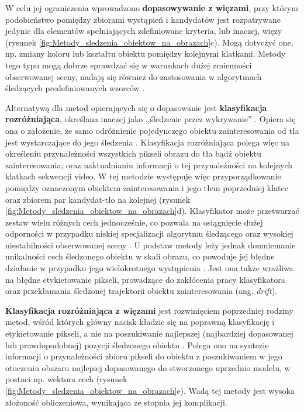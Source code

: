 W celu jej ograniczenia wprowadzono \textbf{dopasowywanie z więzami}, przy którym podobieństwo pomiędzy zbiorami wystąpień i kandydatów jest rozpatrywane jedynie dla elementów spełniających zdefiniowane kryteria, lub inaczej, więzy (rysunek \ref{fig:Metody_sledzenia_obiektow_na_obrazach}c). Mogą dotyczyć one, np. zmiany koloru lub kształtu obiektu pomiędzy kolejnymi klatkami. Metody tego typu mogą dobrze sprawdzać się w warunkach dużej zmienności obserwowanej sceny, nadają się również do zastosowania w algorytmach śledzących predefiniowanych wzorców \cite{Smeulders2010}.

Alternatywą dla metod opierających się o dopasowanie jest \textbf{klasyfikacja rozróżniająca}, określana inaczej jako ,,śledzenie przez wykrywanie'' \cite{Smeulders2010}. Opiera się ona o założenie, że samo odróżnienie pojedynczego obiektu zainteresowania od tła jest wystarczające do jego śledzenia \cite{Smeulders2010}. Klasyfikacja rozróżniająca polega więc na określeniu przynależności wszystkich pikseli obrazu do tła bądź obiektu zainteresowania, oraz uaktualnianiu informacji o tej przynależności na kolejnych klatkach sekwencji video. W tej metodzie występuje więc przyporządkowanie pomiędzy oznaczonym obiektem zainteresowania i jego tłem poprzedniej klatce oraz zbiorem par kandydat-tło na kolejnej (rysunek \ref{fig:Metody_sledzenia_obiektow_na_obrazach}d). Klasyfikator może przetwarzać zestaw wielu różnych cech jednocześnie, co pozwala na osiągnięcie dużej odporności w przypadku niskiej specjalizacji algorytmu śledzącego oraz wysokiej niestabilności obserwowanej sceny \cite{Smeulders2010}. U podstaw metody leży jednak domniemanie unikalności cech śledzonego obiektu w skali obrazu, co powoduje jej błędne działanie w przypadku jego wielokrotnego wystąpienia \cite{Smeulders2010}. Jest ona także wrażliwa na błędne etykietowanie pikseli, prowadzące do zakłócenia pracy klasyfikatora oraz przekłamania śledzonej trajektorii obiektu zainteresowania (ang. \textit{drift}).  

\textbf{Klasyfikacja rozróżniająca z więzami} jest rozwinięciem poprzedniej rodziny metod, wśród których główny nacisk kładzie się na poprawną klasyfikację i etykietowanie pikseli, a nie na poszukiwanie najlepszej (najbardziej dopasowanej lub prawdopodobnej) pozycji śledzonego obiektu \cite{Smeulders2010}. Polega ono na syntezie informacji o przynależności zbioru pikseli do obiektu z poszukiwaniem w jego otoczeniu obszaru najlepiej dopasowanego do stworzonego uprzednio modelu, w postaci np. wektora cech (rysunek \ref{fig:Metody_sledzenia_obiektow_na_obrazach}e). Wadą tej metody jest wysoka złożoność obliczeniowa, wynikająca ze stopnia jej komplikacji.

